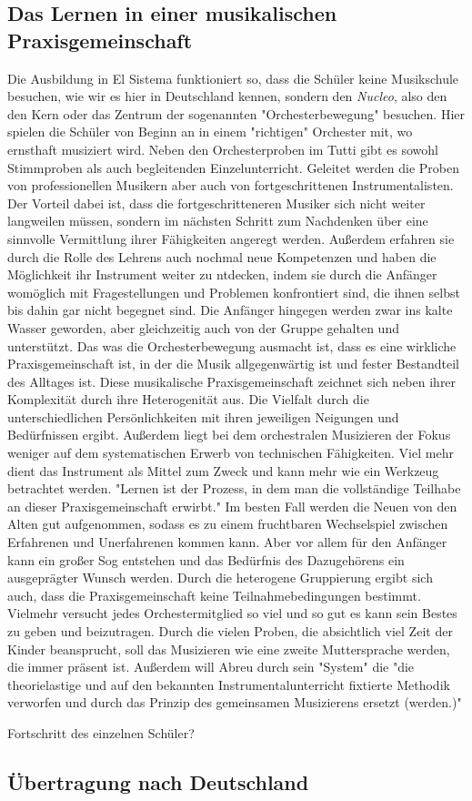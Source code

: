 \subsection{Das Lernen in einer musikalischen Praxisgemeinschaft}
Die Ausbildung in El Sistema funktioniert so, dass die Schüler keine Musikschule
besuchen, wie wir es hier in Deutschland kennen, sondern den \emph{Nucleo}, also
den den Kern oder das Zentrum der sogenannten "Orchesterbewegung" besuchen. Hier
spielen die Schüler von Beginn an in einem "richtigen" Orchester mit, wo
ernsthaft musiziert wird. Neben den Orchesterproben im Tutti gibt es sowohl
Stimmproben als auch begleitenden Einzelunterricht. Geleitet werden die Proben
von professionellen Musikern aber auch von fortgeschrittenen Instrumentalisten.
\autocite[45]{kaufmann:el_sistema} Der Vorteil dabei ist, dass die
fortgeschritteneren Musiker sich nicht weiter langweilen müssen, sondern im
nächsten Schritt zum Nachdenken über eine sinnvolle Vermittlung ihrer
Fähigkeiten angeregt werden. Außerdem erfahren sie durch die Rolle des Lehrens
auch nochmal neue Kompetenzen und haben die Möglichkeit ihr Instrument weiter zu
ntdecken, indem sie durch die Anfänger womöglich mit Fragestellungen und
Problemen konfrontiert sind, die ihnen selbst bis dahin gar nicht begegnet sind.
Die Anfänger hingegen werden zwar ins kalte Wasser
geworden, aber gleichzeitig auch von der Gruppe gehalten und unterstützt.
Das was die Orchesterbewegung ausmacht ist, dass es eine wirkliche
Praxisgemeinschaft ist, in der die Musik allgegenwärtig ist und fester
Bestandteil des Alltages ist. Diese musikalische Praxisgemeinschaft zeichnet
sich neben ihrer Komplexität durch ihre Heterogenität aus. Die Vielfalt durch
die unterschiedlichen Persönlichkeiten mit ihren jeweiligen Neigungen und
Bedürfnissen ergibt. %
Außerdem liegt bei dem orchestralen Musizieren der Fokus weniger auf dem
systematischen Erwerb von technischen Fähigkeiten. Viel mehr dient das
Instrument als Mittel zum Zweck und kann mehr wie ein Werkzeug betrachtet
werden. "Lernen ist der Prozess, in dem man die vollständige Teilhabe an dieser
Praxisgemeinschaft erwirbt." Im besten Fall werden die Neuen von den Alten gut
aufgenommen, sodass es zu einem fruchtbaren Wechselspiel zwischen Erfahrenen und
Unerfahrenen kommen kann. Aber vor allem für den Anfänger kann ein großer Sog
entstehen und das Bedürfnis des Dazugehörens ein ausgeprägter Wunsch werden.
Durch die heterogene Gruppierung ergibt sich auch, dass die Praxisgemeinschaft
keine Teilnahmebedingungen bestimmt. Vielmehr versucht jedes Orchestermitglied
so viel und so gut es kann sein Bestes zu geben und beizutragen. Durch die
vielen Proben, die absichtlich viel Zeit der Kinder beansprucht, soll das
Musizieren wie eine zweite Muttersprache werden, die immer präsent ist.%
Außerdem will Abreu durch sein "System" die "die theorielastige und auf den
bekannten Instrumentalunterricht fixtierte Methodik verworfen und durch das
Prinzip des gemeinsamen Musizierens ersetzt (werden.)" \autocite[45]{kaufmann:el_sistema}


Fortschritt des einzelnen Schüler?

\subsection{Übertragung nach Deutschland}

